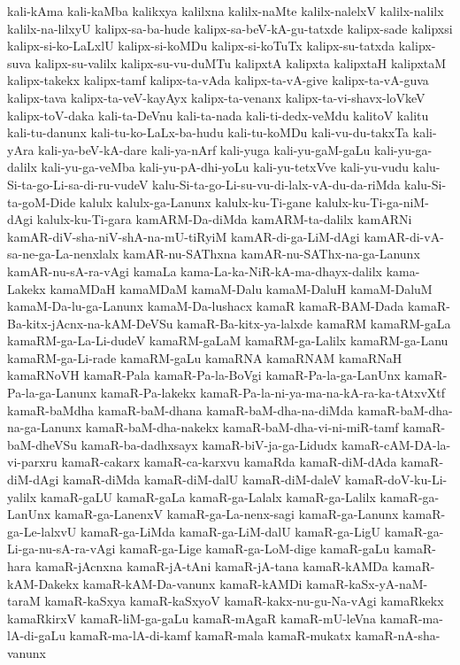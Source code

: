 {kali-kAma
kali-kaMba
kalikxya
kalilxna
kalilx-naMte
kalilx-nalelxV
kalilx-nalilx
kalilx-na-lilxyU
kalipx-sa-ba-hude
kalipx-sa-beV-kA-gu-tatxde
kalipx-sade
kalipxsi
kalipx-si-ko-LaLxlU
kalipx-si-koMDu
kalipx-si-koTuTx
kalipx-su-tatxda
kalipx-suva
kalipx-su-valilx
kalipx-su-vu-duMTu
kalipxtA
kalipxta
kalipxtaH
kalipxtaM
kalipx-takekx
kalipx-tamf
kalipx-ta-vAda
kalipx-ta-vA-give
kalipx-ta-vA-guva
kalipx-tava
kalipx-ta-veV-kayAyx
kalipx-ta-venanx
kalipx-ta-vi-shavx-loVkeV
kalipx-toV-daka
kali-ta-DeVnu
kali-ta-nada
kali-ti-dedx-veMdu
kalitoV
kalitu
kali-tu-danunx
kali-tu-ko-LaLx-ba-hudu
kali-tu-koMDu
kali-vu-du-takxTa
kali-yAra
kali-ya-beV-kA-dare
kali-ya-nArf
kali-yuga
kali-yu-gaM-gaLu
kali-yu-ga-dalilx
kali-yu-ga-veMba
kali-yu-pA-dhi-yoLu
kali-yu-tetxVve
kali-yu-vudu
kalu-Si-ta-go-Li-sa-di-ru-vudeV
kalu-Si-ta-go-Li-su-vu-di-lalx-vA-du-da-riMda
kalu-Si-ta-goM-Dide
kalulx
kalulx-ga-Lanunx
kalulx-ku-Ti-gane
kalulx-ku-Ti-ga-niM-dAgi
kalulx-ku-Ti-gara
kamARM-Da-diMda
kamARM-ta-dalilx
kamARNi
kamAR-diV-sha-niV-shA-na-mU-tiRyiM
kamAR-di-ga-LiM-dAgi
kamAR-di-vA-sa-ne-ga-La-nenxlalx
kamAR-nu-SAThxna
kamAR-nu-SAThx-na-ga-Lanunx
kamAR-nu-sA-ra-vAgi
kamaLa
kama-La-ka-NiR-kA-ma-dhayx-dalilx
kama-Lakekx
kamaMDaH
kamaMDaM
kamaM-Dalu
kamaM-DaluH
kamaM-DaluM
kamaM-Da-lu-ga-Lanunx
kamaM-Da-lushacx
kamaR
kamaR-BAM-Dada
kamaR-Ba-kitx-jAcnx-na-kAM-DeVSu
kamaR-Ba-kitx-ya-lalxde
kamaRM
kamaRM-gaLa
kamaRM-ga-La-Li-dudeV
kamaRM-gaLaM
kamaRM-ga-Lalilx
kamaRM-ga-Lanu
kamaRM-ga-Li-rade
kamaRM-gaLu
kamaRNA
kamaRNAM
kamaRNaH
kamaRNoVH
kamaR-Pala
kamaR-Pa-la-BoVgi
kamaR-Pa-la-ga-LanUnx
kamaR-Pa-la-ga-Lanunx
kamaR-Pa-lakekx
kamaR-Pa-la-ni-ya-ma-na-kA-ra-ka-tAtxvXtf
kamaR-baMdha
kamaR-baM-dhana
kamaR-baM-dha-na-diMda
kamaR-baM-dha-na-ga-Lanunx
kamaR-baM-dha-nakekx
kamaR-baM-dha-vi-ni-miR-tamf
kamaR-baM-dheVSu
kamaR-ba-dadhxsayx
kamaR-biV-ja-ga-Lidudx
kamaR-cAM-DA-la-vi-parxru
kamaR-cakarx
kamaR-ca-karxvu
kamaRda
kamaR-diM-dAda
kamaR-diM-dAgi
kamaR-diMda
kamaR-diM-dalU
kamaR-diM-daleV
kamaR-doV-ku-Li-yalilx
kamaR-gaLU
kamaR-gaLa
kamaR-ga-Lalalx
kamaR-ga-Lalilx
kamaR-ga-LanUnx
kamaR-ga-LanenxV
kamaR-ga-La-nenx-sagi
kamaR-ga-Lanunx
kamaR-ga-Le-lalxvU
kamaR-ga-LiMda
kamaR-ga-LiM-dalU
kamaR-ga-LigU
kamaR-ga-Li-ga-nu-sA-ra-vAgi
kamaR-ga-Lige
kamaR-ga-LoM-dige
kamaR-gaLu
kamaR-hara
kamaR-jAcnxna
kamaR-jA-tAni
kamaR-jA-tana
kamaR-kAMDa
kamaR-kAM-Dakekx
kamaR-kAM-Da-vanunx
kamaR-kAMDi
kamaR-kaSx-yA-naM-taraM
kamaR-kaSxya
kamaR-kaSxyoV
kamaR-kakx-nu-gu-Na-vAgi
kamaRkekx
kamaRkirxV
kamaR-liM-ga-gaLu
kamaR-mAgaR
kamaR-mU-leVna
kamaR-ma-lA-di-gaLu
kamaR-ma-lA-di-kamf
kamaR-mala
kamaR-mukatx
kamaR-nA-sha-vanunx
}
